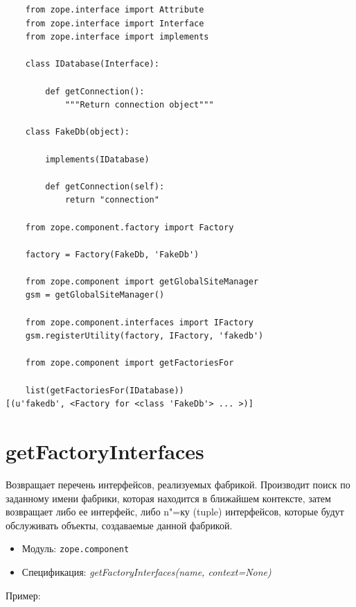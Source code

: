 \documentclass[a4paper,openany,twoside,final]{book}
\providecommand*{\DUroletitlereference}[1]{\textsl{#1}}
\begin{document}
\begin{verbatim}
    from zope.interface import Attribute
    from zope.interface import Interface
    from zope.interface import implements

    class IDatabase(Interface):

        def getConnection():
            """Return connection object"""

    class FakeDb(object):

        implements(IDatabase)

        def getConnection(self):
            return "connection"

    from zope.component.factory import Factory

    factory = Factory(FakeDb, 'FakeDb')

    from zope.component import getGlobalSiteManager
    gsm = getGlobalSiteManager()

    from zope.component.interfaces import IFactory
    gsm.registerUtility(factory, IFactory, 'fakedb')

    from zope.component import getFactoriesFor

    list(getFactoriesFor(IDatabase))
[(u'fakedb', <Factory for <class 'FakeDb'> ... >)]
\end{verbatim}


\section*{getFactoryInterfaces%
  \label{getfactoryinterfaces}%
}

Возвращает перечень интерфейсов, реализуемых фабрикой.  Производит поиск по заданному имени фабрики, которая находится в ближайшем контексте, затем возвращает либо ее интерфейс, либо n"=ку (tuple) интерфейсов, которые будут обслуживать объекты, создаваемые данной фабрикой.

\begin{itemize}

\item Модуль: \texttt{zope.component}

\item Спецификация: \DUroletitlereference{getFactoryInterfaces(name, context=None)}

\end{itemize}

Пример:
\end{document}
